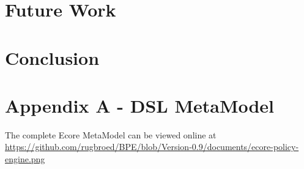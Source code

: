 \documentclass{"The Road to a Building Automation DSL through MDD"}
\begin{document}
\section{Future Work}\label{sec:futureWork}


\section{Conclusion}\label{sec:conclusion}


{}


\section*{Appendix A - DSL MetaModel}\label{app:a-metamodel}
The complete Ecore MetaModel can be viewed online at
\url{https://github.com/rugbroed/BPE/blob/Version-0.9/documents/ecore-policy-engine.png}





\end{document}
